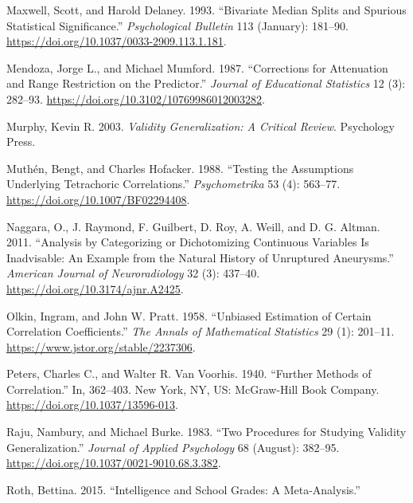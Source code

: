 \documentclass[
  letterpaper,
  DIV=11,
  numbers=noendperiod]{scrreprt}
\newlength{\cslhangindent}
\newlength{\cslentryspacingunit} %
\newenvironment{CSLReferences}[2] %
 {%
  \setlength{\parindent}{0pt}
  \ifodd #1
  \let\oldpar\par
  \def\par{\hangindent=\cslhangindent\oldpar}
  \fi
  \setlength{\parskip}{#2\cslentryspacingunit}
 }%
 {}
\begin{document}
\begin{CSLReferences}{1}{0}
\leavevmode{}%
Maxwell, Scott, and Harold Delaney. 1993. {``Bivariate Median Splits and
Spurious Statistical Significance.''} \emph{Psychological Bulletin} 113
(January): 181--90. \url{https://doi.org/10.1037/0033-2909.113.1.181}.

\leavevmode{}%
Mendoza, Jorge L., and Michael Mumford. 1987. {``Corrections for
Attenuation and Range Restriction on the Predictor.''} \emph{Journal of
Educational Statistics} 12 (3): 282--93.
\url{https://doi.org/10.3102/10769986012003282}.

\leavevmode{}%
Murphy, Kevin R. 2003. \emph{Validity Generalization: A Critical
Review}. Psychology Press.

\leavevmode{}%
Muthén, Bengt, and Charles Hofacker. 1988. {``Testing the Assumptions
Underlying Tetrachoric Correlations.''} \emph{Psychometrika} 53 (4):
563--77. \url{https://doi.org/10.1007/BF02294408}.

\leavevmode{}%
Naggara, O., J. Raymond, F. Guilbert, D. Roy, A. Weill, and D. G.
Altman. 2011. {``Analysis by Categorizing or Dichotomizing Continuous
Variables Is Inadvisable: An Example from the Natural History of
Unruptured Aneurysms.''} \emph{American Journal of Neuroradiology} 32
(3): 437--40. \url{https://doi.org/10.3174/ajnr.A2425}.

\leavevmode{}%
Olkin, Ingram, and John W. Pratt. 1958. {``Unbiased Estimation of
Certain Correlation Coefficients.''} \emph{The Annals of Mathematical
Statistics} 29 (1): 201--11. \url{https://www.jstor.org/stable/2237306}.

\leavevmode{}%
Peters, Charles C., and Walter R. Van Voorhis. 1940. {``Further Methods
of Correlation.''} In, 362--403. New York, NY, US: McGraw-Hill Book
Company. \url{https://doi.org/10.1037/13596-013}.

\leavevmode{}%
Raju, Nambury, and Michael Burke. 1983. {``Two Procedures for Studying
Validity Generalization.''} \emph{Journal of Applied Psychology} 68
(August): 382--95. \url{https://doi.org/10.1037/0021-9010.68.3.382}.

\leavevmode{}%
Roth, Bettina. 2015. {``Intelligence and School Grades: A
Meta-Analysis.''}


\end{CSLReferences}
\end{document}
